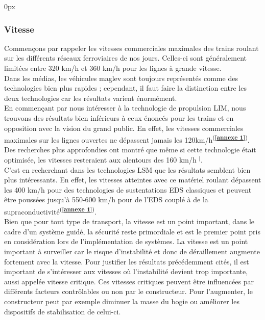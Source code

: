 \documentclass[12pt, a4paper, onecolumn]{article}
\makeatletter
\renewcommand{\tab}{\tabto{15px}}
\newcommand{\csvdel}{}
\newcommand{\bettercite}[1][,]{%
  \renewcommand{\csvdel}{\renewcommand{\csvdel}{}}%
  \csname\endcsname$^[$\checknextarg}
\newcommand{\checknextarg}{\@ifnextchar\bgroup{\gobblenext}{}}%
\newcommand{\gobblenext}[1]{\csvdel\textcolor{blue}{\textbf{\cite{#1}}}\@ifnextchar\bgroup{$^,$\gobblenext}{$^]$}}%
\newcommand{\cfannexe}[1]{\textsuperscript{(\textcolor{blue}{\textbf{\ref{annexe #1}}})}}
\makeatother
\begin{document}
\begin{addmargin}[30px]{0px} \subsubsection*{Vitesse}\end{addmargin}
\tab Commençons par rappeler les vitesses commerciales maximales des trains roulant sur les différents réseaux ferroviaires de nos jours. Celles-ci sont généralement limitées entre 320 km/h et 360 km/h pour les lignes à grande vitesse. \\
\tab Dans les médias, les véhicules maglev sont toujours représentés comme des technologies bien plus rapides ; cependant, il faut faire la distinction entre les deux technologies car les résultats varient énormément. \\
\linebreak
\tab En commençant par nous intéresser à la technologie de propulsion LIM, nous trouvons des résultats bien inférieurs à ceux énoncés pour les trains et en opposition avec la vision du grand public.
En effet, les vitesses commerciales maximales sur les lignes ouvertes ne dépassent jamais les 120km/h\cfannexe{1}.
Des recherches plus approfondies ont montré que même si cette technologie était optimisée, les vitesses resteraient aux alentours des 160 km/h\bettercite{optimisationchangsha}. \\
\linebreak
\tab C’est en recherchant dans les technologies LSM que les résultats semblent bien plus intéressants.
En effet, les vitesses atteintes avec ce matériel roulant dépassent les 400 km/h pour des technologies de sustentations EDS classiques et peuvent être poussées jusqu'à 550-600 km/h pour de l’EDS couplé à de la supraconductivité\cfannexe{1}. \\
\linebreak
\tab Bien que pour tout type de transport, la vitesse est un point important, dans le cadre d’un système guidé, la sécurité reste primordiale et est le premier point pris en considération lors de l’implémentation de systèmes.
La vitesse est un point important à surveiller car le risque d’instabilité et donc de déraillement augmente fortement avec la vitesse.
Pour justifier les résultats précédemment cités, il est important de s'intéresser aux vitesses où l’instabilité devient trop importante, aussi appelée vitesse critique.
Ces vitesses critiques peuvent être influencées par différents facteurs contrôlables ou non par le constructeur.
Pour l'augmenter, le constructeur peut par exemple diminuer la masse du bogie ou améliorer les dispositifs de stabilisation de celui-ci.
\end{document}

